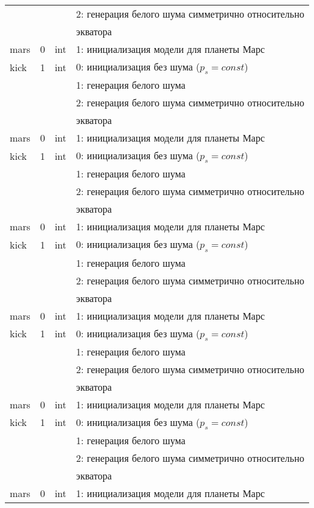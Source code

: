 \documentclass[14pt]{extreport}
\begin{document}
\begin{longtable}[c]{|l|c|l|l|}
      &   &     & 2: генерация белого шума симметрично относительно \\
  & & & экватора    \\
 mars & 0 & int & 1: инициализация модели для планеты Марс     \\
kick & 1 & int & 0: инициализация без шума ($p_s = const$) \\
      &   &     & 1: генерация белого шума                  \\
      &   &     & 2: генерация белого шума симметрично относительно \\
  & & & экватора    \\
 mars & 0 & int & 1: инициализация модели для планеты Марс     \\
kick & 1 & int & 0: инициализация без шума ($p_s = const$) \\
      &   &     & 1: генерация белого шума                  \\
      &   &     & 2: генерация белого шума симметрично относительно \\
  & & & экватора    \\
 mars & 0 & int & 1: инициализация модели для планеты Марс     \\
kick & 1 & int & 0: инициализация без шума ($p_s = const$) \\
      &   &     & 1: генерация белого шума                  \\
      &   &     & 2: генерация белого шума симметрично относительно \\
  & & & экватора    \\
 mars & 0 & int & 1: инициализация модели для планеты Марс     \\
kick & 1 & int & 0: инициализация без шума ($p_s = const$) \\
      &   &     & 1: генерация белого шума                  \\
      &   &     & 2: генерация белого шума симметрично относительно \\
  & & & экватора    \\
 mars & 0 & int & 1: инициализация модели для планеты Марс     \\
kick & 1 & int & 0: инициализация без шума ($p_s = const$) \\
      &   &     & 1: генерация белого шума                  \\
      &   &     & 2: генерация белого шума симметрично относительно \\
  & & & экватора    \\
 mars & 0 & int & 1: инициализация модели для планеты Марс     \\

\end{longtable}
\end{document}
